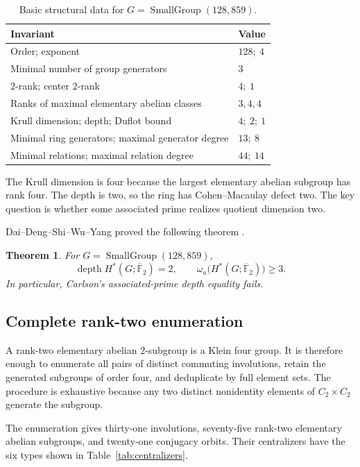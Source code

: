 \documentclass[11pt]{amsart}
\newtheorem{theorem}{Theorem}[section]
\theoremstyle{definition}
\theoremstyle{remark}
\DeclareMathOperator{\depth}{depth}
\newcommand{\kbar}{\overline{\mathbb F}_{2}}
\newcommand{\SG}[2]{\operatorname{SmallGroup}(#1,#2)}
\begin{document}
\begin{table}[ht]
\centering
\caption{Basic structural data for \(G=\SG{128}{859}\).}
\label{tab:basic-data}
\begin{tabular}{@{}ll@{}}
\toprule
Invariant & Value \\
\midrule
Order; exponent & \(128;\ 4\) \\
Minimal number of group generators & \(3\) \\
\(2\)-rank; center \(2\)-rank & \(4;\ 1\) \\
Ranks of maximal elementary abelian classes & \(3,4,4\) \\
Krull dimension; depth; Duflot bound & \(4;\ 2;\ 1\) \\
Minimal ring generators; maximal generator degree & \(13;\ 8\) \\
Minimal relations; maximal relation degree & \(44;\ 14\) \\
\bottomrule
\end{tabular}
\end{table}

The Krull dimension is four because the largest elementary abelian subgroup has rank four.  The depth is two, so the ring has Cohen--Macaulay defect two.  The key question is whether some associated prime realizes quotient dimension two.

Dai--Deng--Shi--Wu--Yang proved the following theorem \cite{DaiEtAl2026}.
\begin{theorem}
\label{thm:counterexample}
For \(G=\SG{128}{859}\),
\[
\depth H^*(G;\kbar)=2,
\qquad
\omega_a\bigl(H^*(G;\kbar)\bigr)\geq3.
\]
In particular, Carlson's associated-prime depth equality fails.
\end{theorem}

\subsection{Complete rank-two enumeration}

A rank-two elementary abelian \(2\)-subgroup is a Klein four group.  It is therefore enough to enumerate all pairs of distinct commuting involutions, retain the generated subgroups of order four, and deduplicate by full element sets.  The procedure is exhaustive because any two distinct nonidentity elements of \(C_2\times C_2\) generate the subgroup.

The enumeration gives thirty-one involutions, seventy-five rank-two elementary abelian subgroups, and twenty-one conjugacy orbits.  Their centralizers have the six types shown in Table~\ref{tab:centralizers}.
\end{document}
